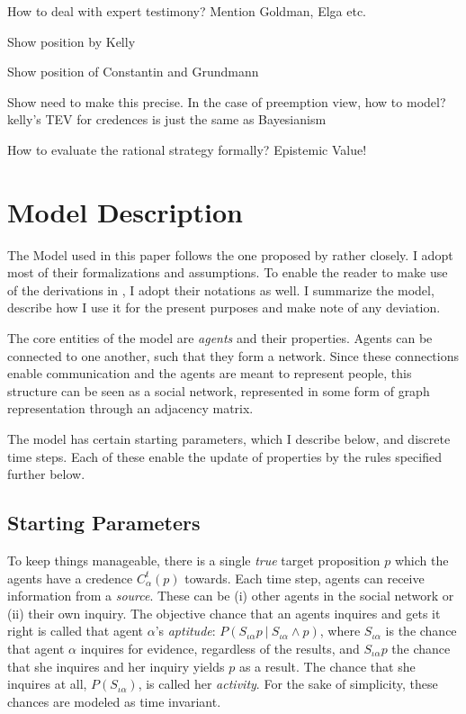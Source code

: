 \documentclass[11pt, a4paper]{scrartcl}
\newcommand{\given}[1][]{\:#1\vert\:}
\renewcommand{\i}[1]{\emph{#1}}
\begin{document}
How to deal with expert testimony? Mention Goldman, Elga etc.

Show position by Kelly

Show position of Constantin and Grundmann



Show need to make this precise. In the case of preemption view, how to model? 
kelly's TEV for credences is just the same as Bayesianism 

How to evaluate the rational strategy formally?
Epistemic Value!

\section{Model Description}

The Model used in this paper follows the one proposed by \textcite{Olsson2013} rather closely. I adopt most of their formalizations and assumptions. To enable the reader to make use of the derivations in \textcite{Angere2010}, I adopt their notations as well. I summarize the model, describe how I use it for the present purposes and make note of any deviation.

The core entities of the model are \i{agents} and their properties. Agents can be connected to one another, such that they form a network. Since these connections enable communication and the agents are meant to represent people, this structure can be seen as a social network, represented in some form of graph representation through an adjacency matrix.

The model has certain starting parameters, which I describe below, and discrete time steps. Each of these enable the update of properties by the rules specified further below.

\subsection{Starting Parameters}

To keep things manageable, there is a single \i{true} target proposition $p$ which the agents have a credence $C^t_\alpha(p)$ towards. Each time step, agents can receive information from a \i{source}. These can be (i) other agents in the social network or (ii) their own inquiry. The objective chance that an agents inquires and gets it right is called that agent $\alpha$'s \i{aptitude}: $P(S_{\iota \alpha}p \given S_{\iota \alpha} \land p)$, where $S_{\iota \alpha}$ is the chance that agent $\alpha$ inquires for evidence, regardless of the results, and $S_{\iota \alpha} p$ the chance that she inquires and her inquiry yields $p$ as a result. The chance that she inquires at all, $P(S_{\iota \alpha})$, is called her \i{activity}. For the sake of simplicity, these chances are modeled as time invariant.
\end{document}
